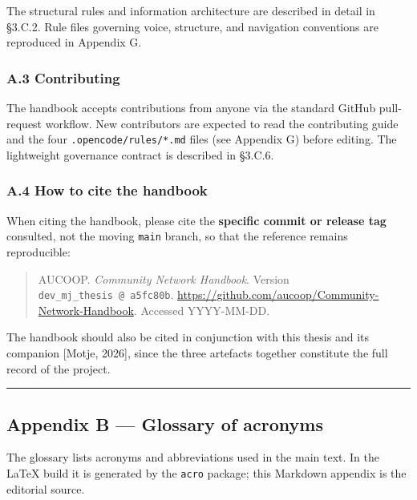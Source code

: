 The structural rules and information architecture are described in
detail in §3.C.2. Rule files governing voice, structure, and navigation
conventions are reproduced in Appendix G.

\hypertarget{a.3-contributing}{%
\subsubsection{A.3 Contributing}\label{a.3-contributing}}

The handbook accepts contributions from anyone via the standard GitHub
pull-request workflow. New contributors are expected to read the
contributing guide and the four \texttt{.opencode/rules/*.md} files (see
Appendix G) before editing. The lightweight governance contract is
described in §3.C.6.

\hypertarget{a.4-how-to-cite-the-handbook}{%
\subsubsection{A.4 How to cite the
handbook}\label{a.4-how-to-cite-the-handbook}}

When citing the handbook, please cite the \textbf{specific commit or
release tag} consulted, not the moving \texttt{main} branch, so that the
reference remains reproducible:

\begin{quote}
AUCOOP. \emph{Community Network Handbook}. Version
\texttt{dev\_mj\_thesis\ @\ a5fc80b}.
\url{https://github.com/aucoop/Community-Network-Handbook}. Accessed
YYYY-MM-DD.
\end{quote}

The handbook should also be cited in conjunction with this thesis and
its companion {[}Motje, 2026{]}, since the three artefacts together
constitute the full record of the project.

\begin{center}\rule{0.5\linewidth}{0.5pt}\end{center}

\hypertarget{appendix-b-glossary-of-acronyms}{%
\subsection{Appendix B --- Glossary of
acronyms}\label{appendix-b-glossary-of-acronyms}}

The glossary lists acronyms and abbreviations used in the main text. In
the LaTeX build it is generated by the \texttt{acro} package; this
Markdown appendix is the editorial source.

